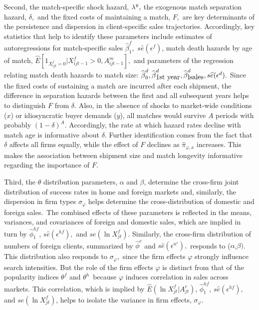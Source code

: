 \documentclass[12pt,titlepage]{article}
\begin{document}
Second, the match-specific shock hazard, ${\small \lambda }^{y},$ the
exogenous match separation hazard, $\delta ,$ and the fixed costs of
maintaining a match, $F,$ are key determinants of the persistence and
dispersion in client-specific sales trajectories. Accordingly, key
statistics that help to identify these parameters include estimates of
autoregressions for match-specific sales $\widehat{\beta }_{1}^{f},$ $s%
\widehat{e}(\epsilon ^{f})$, match death hazards by age of match, $\widehat{E%
}[1_{X_{ijt}^{f}=0}|X_{ijt-1}^{f}>0,A_{ijt-1}^{m}],$ and parameters of the
regression relating match death hazards to match size: $\widehat{\beta }%
_{0}^{d},\widehat{\beta }_{\mbox{1st year}}^{d},\widehat{\beta }_{%
\mbox{lsales}}^{d},s\widehat{e}(\epsilon ^{d}).$ Since the fixed costs of
sustaining a match are incurred after each shipment, the difference in
separation hazards between the first and all subsequent years helps to
distinguish $F$ from $\delta .$ Also, in the absence of shocks to
market-wide conditions ($x$) or idiosyncratic buyer demands ($y$), all
matches would survive $A$ periods with probably $(1-\delta )^{A}.$
Accordingly, the rate at which hazard rates decline with match age is
informative about $\delta .$ Further identification comes from the fact that 
$\delta $ affects all firms equally, while the effect of $F$ declines as $%
\widehat{\pi }_{\varphi ,x}$ increases. This makes the association between
shipment size and match longevity informative regarding the importance of $%
F. $

Third, the $\theta $ distribution parameters, $\alpha $ and $\beta $,
determine the cross-firm joint distribution of success rates in home and
foreign markets and, similarly, the dispersion in firm types $\sigma
_{\varphi }$ helps determine the cross-distribution of domestic and foreign
sales.\ The combined effects of these parameters is reflected in the means,
variances, and covariances of foreign and domestic sales, which are implied
in turn by $\widehat{\phi }_{1}^{hf}$, $s\widehat{e}(\epsilon ^{hf}),$ and $%
se(\ln X_{jt}^{f}).$ Similarly, the cross-firm distribution of numbers of
foreign clients, summarized by $\widehat{\phi }^{c}$ and $s\widehat{e}%
(\epsilon ^{n^{c}}),$ responds to ($\alpha $,$\beta )$. This distribution
also responds to $\sigma _{\varphi },$ since the firm effects $\varphi $
strongly influence search intensities. But the role of the firm effects $%
\varphi $ is distinct from that of the popularity indices $\theta ^{f}$ and $%
\theta ^{h}$\ because $\varphi $ induces correlation in sales across
markets. This correlation, which is implied by $\widehat{E}(\ln
X_{jt}^{f}|A_{jt}^{c})$, $\widehat{\phi }_{1}^{hf}$, $s\widehat{e}(\epsilon
^{hf}),$ and $se(\ln X_{jt}^{f})$, helps to isolate the variance in firm
effects, $\sigma _{\varphi }.$
\end{document}
